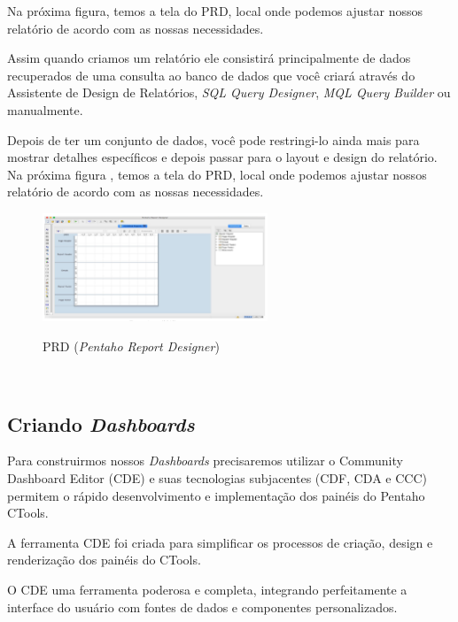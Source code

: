 Na  pr\'oxima figura, temos a tela do PRD, local onde podemos ajustar nossos relat\'orio de acordo com as nossas
necessidades.

Assim quando criamos um relat\'orio ele consistir\'{a} principalmente de dados recuperados de uma consulta ao banco de dados que você criar\'{a} atrav\'{e}s do Assistente de Design de Relat\'orios, \textit{SQL Query Designer}, \textit{MQL Query Builder} ou manualmente. 

Depois de ter um conjunto de dados, você pode restringi-lo ainda mais para mostrar detalhes espec\'{i}ficos e depois passar para o layout e design do relat\'orio. Na pr\'oxima figura , temos a tela do PRD, local onde podemos ajustar nossos relat\'orio de acordo com as nossas necessidades.

\begin{figure}[H]
	\vspace*{0,2cm}
    \centering
    \caption{PRD (\textit{Pentaho Report Designer})}
    \includegraphics[width=0.6\textwidth]{./04-figuras/figura-pentaho-prd}
    \label{fig:ilustfigpentahoprd}
\end{figure}
\vspace*{-0,9cm}
{\raggedright {}} \\


\subsection{Criando \textit{Dashboards}}

Para construirmos nossos \textit{Dashboards} precisaremos utilizar o  Community Dashboard Editor (CDE) e suas tecnologias subjacentes (CDF, CDA e CCC) permitem o r\'{a}pido desenvolvimento e implementa\c{c}\~{a}o dos pain\'{e}is do Pentaho CTools. 

A ferramenta CDE foi criada para simplificar os processos de cria\c{c}\~{a}o, design e renderiza\c{c}\~{a}o dos pain\'{e}is do CTools.

O CDE uma ferramenta poderosa e completa, integrando perfeitamente a interface do usu\'{a}rio com fontes de dados e componentes personalizados.

